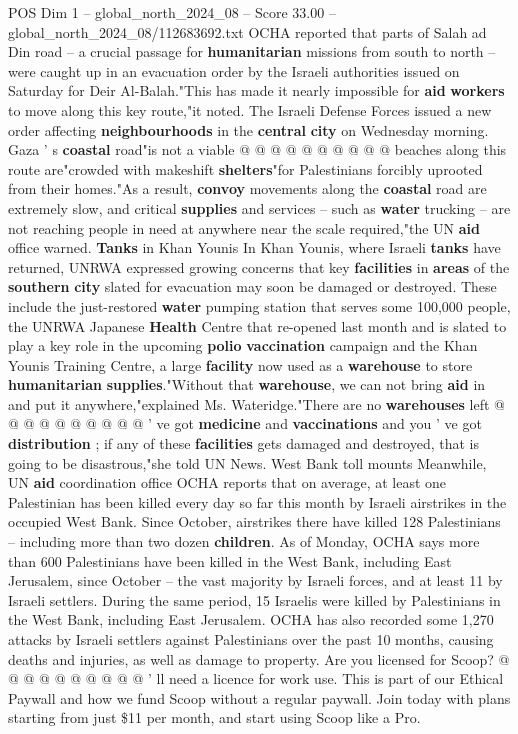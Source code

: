 \begin{textsample}{POS Dim 1 – global\_north\_2024\_08 – Score 33.00 – global\_north\_2024\_08/112683692.txt}
OCHA reported that parts of Salah ad Din road -- a crucial passage for \textbf{humanitarian} missions from south to north -- were caught up in an evacuation order by the Israeli authorities issued on Saturday for Deir Al-Balah."This has made it nearly impossible for \textbf{aid} \textbf{workers} to move along this key route,"it noted.
The Israeli Defense Forces issued a new order affecting \textbf{neighbourhoods} in the \textbf{central} \textbf{city} on Wednesday morning.
Gaza ' s \textbf{coastal} road"is not a viable @ @ @ @ @ @ @ @ @ @ beaches along this route are"crowded with makeshift \textbf{shelters}"for Palestinians forcibly uprooted from their homes."As a result, \textbf{convoy} movements along the \textbf{coastal} road are extremely slow, and critical \textbf{supplies} and services -- such as \textbf{water} trucking -- are not reaching people in need at anywhere near the scale required,"the UN \textbf{aid} office warned. \textbf{Tanks} in Khan Younis In Khan Younis, where Israeli \textbf{tanks} have returned, UNRWA expressed growing concerns that key \textbf{facilities} in \textbf{areas} of the \textbf{southern} \textbf{city} slated for evacuation may soon be damaged or destroyed.
These include the just-restored \textbf{water} pumping station that serves some 100,000 people, the UNRWA Japanese \textbf{Health} Centre that re-opened last month and is slated to play a key role in the upcoming \textbf{polio} \textbf{vaccination} campaign and the Khan Younis Training Centre, a large \textbf{facility} now used as a \textbf{warehouse} to store \textbf{humanitarian} \textbf{supplies}."Without that \textbf{warehouse}, we can not bring \textbf{aid} in and put it anywhere,"explained Ms.
Wateridge."There are no \textbf{warehouses} left @ @ @ @ @ @ @ @ @ @ ' ve got \textbf{medicine} and \textbf{vaccinations} and you ' ve got \textbf{distribution} ; if any of these \textbf{facilities} gets damaged and destroyed, that is going to be disastrous,"she told UN News.
West Bank toll mounts Meanwhile, UN \textbf{aid} coordination office OCHA reports that on average, at least one Palestinian has been killed every day so far this month by Israeli airstrikes in the occupied West Bank.
Since October, airstrikes there have killed 128 Palestinians -- including more than two dozen \textbf{children}.
As of Monday, OCHA says more than 600 Palestinians have been killed in the West Bank, including East Jerusalem, since October -- the vast majority by Israeli forces, and at least 11 by Israeli settlers.
During the same period, 15 Israelis were killed by Palestinians in the West Bank, including East Jerusalem.
OCHA has also recorded some 1,270 attacks by Israeli settlers against Palestinians over the past 10 months, causing deaths and injuries, as well as damage to property.
Are you licensed for Scoop? @ @ @ @ @ @ @ @ @ @ ' ll need a licence for work use.
This is part of our Ethical Paywall and how we fund Scoop without a regular paywall.
Join today with plans starting from just \$11 per month, and start using Scoop like a Pro.


\end{textsample}
